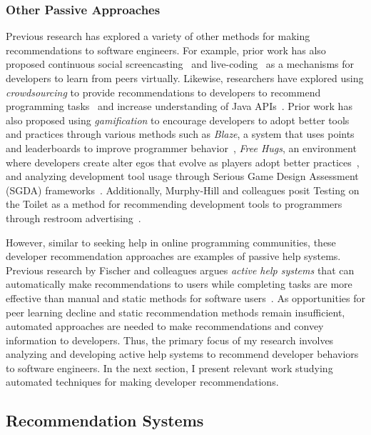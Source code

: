 \subsubsection{Other Passive Approaches}

Previous research has explored a variety of other methods for making recommendations to software engineers. For example, prior work has also proposed continuous social screencasting~\cite{Murphy-HillScreencastingDiscovery} and live-coding~\cite{blackwell2014collaboration} as a mechanisms for developers to learn from peers virtually. Likewise, researchers have explored using \textit{crowdsourcing} to provide recommendations to developers to recommend programming tasks~\cite{Mao15Crowd} and increase understanding of Java APIs~\cite{Peng19Crowd}. Prior work has also proposed using \textit{gamification} to encourage developers to adopt better tools and practices through various methods such as \textsl{Blaze}, a system that uses points and leaderboards to improve programmer behavior~\cite{Snipes2014Experiences}, \textsl{Free Hugs}, an environment where developers create alter egos that evolve as players adopt better practices~\cite{FreeHugs}, and analyzing development tool usage through Serious Game Design Assessment (SGDA) frameworks~\cite{barik2016game}. Additionally, Murphy-Hill and colleagues posit Testing on the Toilet as a method for recommending development tools to programmers through restroom advertising~\cite{Murphy-Hill2019Toilet}. 

However, similar to seeking help in online programming communities, these developer recommendation approaches are examples of passive help systems. Previous research by Fischer and colleagues argues \textit{active help systems} that can automatically make recommendations to users while completing tasks are more effective than manual and static methods for software users~\cite{Fischer1984ActiveHelpSystems}. As opportunities for peer learning decline and static recommendation methods remain insufficient, automated approaches are needed to make recommendations and convey information to developers. Thus, the primary focus of my research involves analyzing and developing active help systems to recommend developer behaviors to software engineers. In the next section, I present relevant work studying automated techniques for making developer recommendations.

\subsection{Recommendation Systems}


